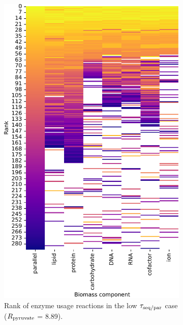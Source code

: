 \begin{figure}
  \centering
  \begin{subfigure}[t]{0.45\textwidth}
  \centering
    \includegraphics[width=\linewidth]{CompareEnzUse_glc00p00_pyr08p89_ammUnres_1.pdf}
    \caption{
      Rank of enzyme usage reactions in the low $\tau_{\mathrm{seq}/\mathrm{par}}$ case ($R_{\mathrm{pyruvate}}$ = \SI{8.89}{\mmolgdwh}).
    }
    \label{fig:model-rank-pyr-lowratio-rank}
  \end{subfigure}%
  \begin{subfigure}[t]{0.45\textwidth}
  \centering

\end{subfigure}
\end{figure}
